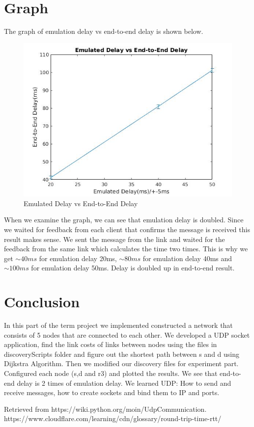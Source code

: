 \documentclass[conference]{IEEEtran}
\begin{document}
\section{Graph}
The graph of emulation delay vs end-to-end delay is shown below.
\begin{figure}[h]
\includegraphics[scale = 0.5]{nett.jpg}
\caption{Emulated Delay vs End-to-End Delay}
\end{figure}
\FloatBarrier

When we examine the graph, we can see that emulation delay is doubled. Since we waited for feedback from each client that confirms the message is received this result makes sense. We sent the message from the link and waited for the feedback from the same link which calculates the time two times. This is why we get $\sim40ms$ for emulation delay 20ms, $\sim80ms$ for emulation delay 40ms and $\sim100ms$ for emulation delay 50ms. Delay is doubled up in end-to-end result.
\section{Conclusion}
In this part of the term project we implemented constructed a network that consists of 5 nodes that are connected to each other. We developed a UDP socket application, find the link costs of links between nodes using the files in discoveryScripts folder and figure out the shortest path between s and d using Dijkstra Algorithm. Then we modified our discovery files for experiment part. Configured each node (s,d and r3) and plotted the results. We see that end-to-end delay is 2 times of emulation delay. We learned UDP: How to send and receive messages, how to create sockets and bind them to IP and ports.
\begin{thebibliography}{00}
 Retrieved from https://wiki.python.org/moin/UdpCommunication.
 https://www.cloudflare.com/learning/cdn/glossary/round-trip-time-rtt/
\end{thebibliography}
\end{document}
